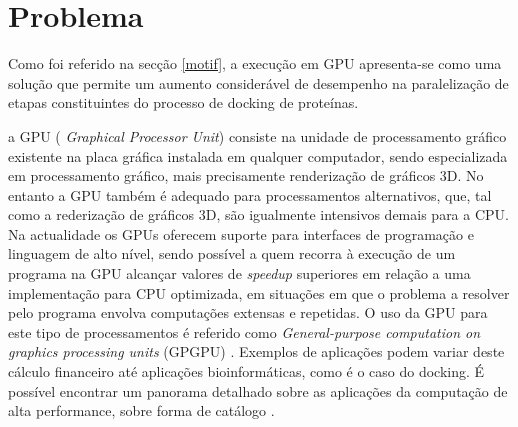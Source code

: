 \section{Problema}
%
%
 Como foi referido na secção \ref{motif}, a execução em GPU apresenta-se como uma solução que permite um aumento considerável de desempenho na paralelização de etapas constituintes do processo de docking de proteínas. \par
a GPU ( \textit{Graphical Processor Unit}) consiste na unidade de processamento gráfico existente na placa gráfica instalada em qualquer computador, sendo especializada em processamento gráfico, mais precisamente renderização de gráficos 3D.
 No entanto a GPU também é adequado para processamentos alternativos, que, tal como a rederização de gráficos 3D, são igualmente intensivos demais para a CPU. Na actualidade os GPUs oferecem suporte para interfaces de programação e linguagem de alto nível, sendo possível a quem recorra à execução de um programa na GPU alcançar valores de \textit{speedup} superiores em relação a uma implementação para CPU optimizada, em situações em que o problema a resolver pelo programa envolva computações extensas e repetidas. O uso da GPU para este tipo de processamentos é referido como \textit{General-purpose computation on graphics processing units} (GPGPU) \cite{gpgpu}. Exemplos de aplicações podem variar deste cálculo financeiro até aplicações bioinformáticas, como é o caso do docking. É possível encontrar um panorama detalhado sobre as aplicações da computação de alta performance, sobre forma de catálogo \cite{cudaIntro}.
